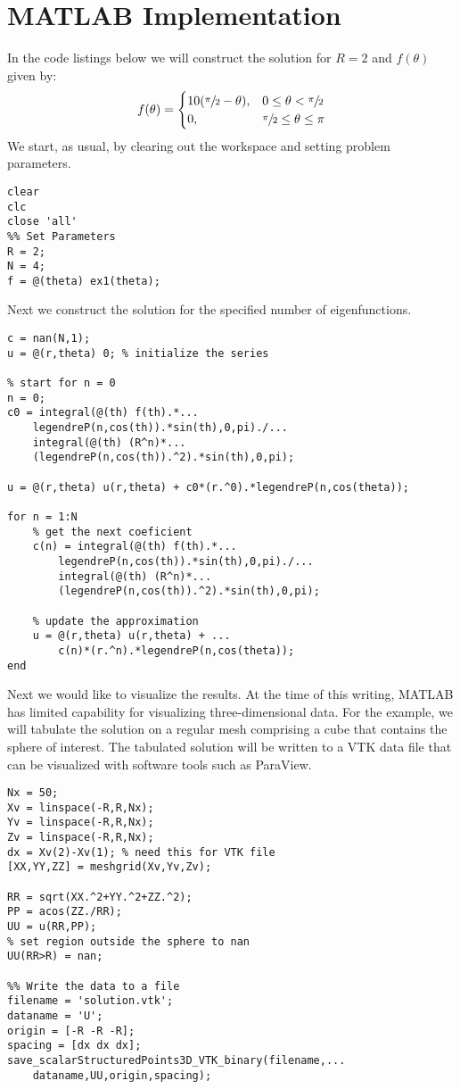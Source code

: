 \section{MATLAB Implementation}
In the code listings below we will construct the solution for $R = 2$ and $f(\theta)$ given by:
\begin{equation*}
f(\theta) = 
\begin{cases}
10(\sfrac{\pi}{2}-\theta), & 0 \le \theta < \sfrac{\pi}{2} \\
0, & \sfrac{\pi}{2} \le \theta \le \pi
\end{cases}
\end{equation*}
We start, as usual, by clearing out the workspace and setting problem parameters.
\begin{lstlisting}[name=lec34-ex, style=myMatlab]
clear
clc
close 'all'
%% Set Parameters
R = 2;
N = 4;
f = @(theta) ex1(theta);
\end{lstlisting}
Next we construct the solution for the specified number of eigenfunctions.
\begin{lstlisting}[name=lec34-ex, style=myMatlab]
%% Construct the Solution
c = nan(N,1);
u = @(r,theta) 0; % initialize the series

% start for n = 0 
n = 0;
c0 = integral(@(th) f(th).*...
    legendreP(n,cos(th)).*sin(th),0,pi)./...
    integral(@(th) (R^n)*...
    (legendreP(n,cos(th)).^2).*sin(th),0,pi);

u = @(r,theta) u(r,theta) + c0*(r.^0).*legendreP(n,cos(theta));    

for n = 1:N 
    % get the next coeficient
    c(n) = integral(@(th) f(th).*...
        legendreP(n,cos(th)).*sin(th),0,pi)./...
        integral(@(th) (R^n)*...
        (legendreP(n,cos(th)).^2).*sin(th),0,pi);
    
    % update the approximation
    u = @(r,theta) u(r,theta) + ...
        c(n)*(r.^n).*legendreP(n,cos(theta)); 
end
\end{lstlisting}
Next we would like to visualize the results.  At the time of this writing, MATLAB has limited capability for visualizing three-dimensional data.  For the example, we will tabulate the solution on a regular mesh comprising a cube that contains the sphere of interest.  The tabulated solution will be written to a VTK data file that can be visualized with software tools such as ParaView.
\begin{lstlisting}[name=lec34-ex, style=myMatlab]
%% Process Result for Plotting 
Nx = 50;
Xv = linspace(-R,R,Nx);
Yv = linspace(-R,R,Nx);
Zv = linspace(-R,R,Nx);
dx = Xv(2)-Xv(1); % need this for VTK file
[XX,YY,ZZ] = meshgrid(Xv,Yv,Zv);

RR = sqrt(XX.^2+YY.^2+ZZ.^2);
PP = acos(ZZ./RR);
UU = u(RR,PP); 
% set region outside the sphere to nan
UU(RR>R) = nan;

%% Write the data to a file
filename = 'solution.vtk';
dataname = 'U';
origin = [-R -R -R]; 
spacing = [dx dx dx];
save_scalarStructuredPoints3D_VTK_binary(filename,...
    dataname,UU,origin,spacing);
\end{lstlisting}
